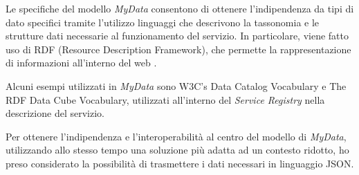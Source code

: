 Le specifiche del modello \textit{MyData} consentono di ottenere l’indipendenza da tipi di dato specifici tramite l’utilizzo linguaggi che descrivono la tassonomia e le strutture dati necessarie al funzionamento del servizio. In particolare, viene fatto uso di RDF (Resource Description Framework), che permette la rappresentazione di informazioni all’interno del web \cite{w3crdf}.

Alcuni esempi utilizzati in \textit{MyData} sono W3C’s Data Catalog Vocabulary\cite{w3cdatacatalog} e The RDF Data Cube Vocabulary\cite{w3cdatacube}, utilizzati all’interno del \textit{Service Registry} nella descrizione del servizio.

Per ottenere l’indipendenza e l’interoperabilit\`a al centro del modello di \textit{MyData}, utilizzando allo stesso tempo una soluzione pi\`u adatta ad un contesto ridotto, ho preso considerato la possibilit\`a di trasmettere i dati necessari in linguaggio JSON.


